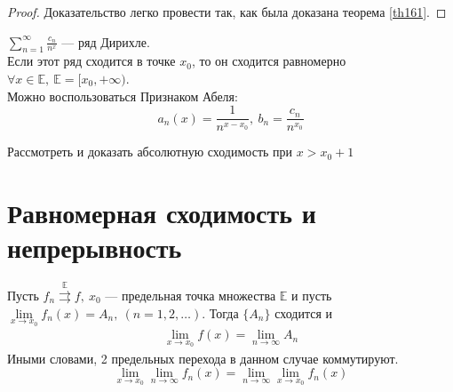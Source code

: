 \begin{proof}
  Доказательство легко провести так, как была доказана теорема \eqref{th161}.
\end{proof}

\begin{example}
  $\sum\limits_{n = 1}^{\infty} \frac{c_n}{n^x}$ ---
  ряд Дирихле. \\
  Если этот ряд сходится в точке $x_0$, то он сходится равномерно
  $\forall x \in \mathbb{E}, \ \mathbb{E} = [x_0, +\infty)$. \\
  Можно воспользоваться Признаком Абеля:
  $$a_n(x) = \frac{1}{n^{x-x_0}}, \ b_n = \frac{c_n}{n^{x_0}}$$
\end{example}

\begin{exercise}
  Рассмотреть и доказать абсолютную сходимость при $x > x_0 + 1$
\end{exercise}

\section{Равномерная сходимость и непрерывность}

\begin{theorem}
  Пусть $f_n \stackrel{\mathrm{\mathbb{E}}}{\rightrightarrows} f, \ x_0$ ---
  предельная точка множества $\mathbb{E}$ и пусть
  $\lim\limits_{x \to x_0} f_n(x) = A_n, \ (n = 1, 2, \dots).$
  Тогда $\{A_n\}$ сходится и
  \begin{gather}
    \lim\limits_{x \to x_0} f(x) = \lim\limits_{n \to \infty} A_n \label{th241:lim1}
  \end{gather}
  Иными словами, 2 предельных перехода в данном случае коммутируют. \\
  $$\lim\limits_{x \to x_0} \lim\limits_{n \to \infty} f_n(x) =
  \lim\limits_{n \to \infty} \lim\limits_{x \to x_0} f_n(x)$$
\end{theorem}

